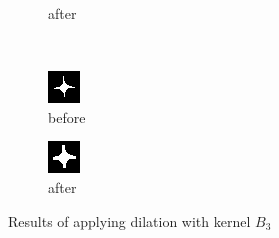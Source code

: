 \documentclass[12pt]{article}
\renewcommand{\subfiguresize}{.25\textwidth}
\begin{document}
\begin{figure}[H]
\begin{subfigure}[t]{\subfiguresize}
        \caption{after}
    \end{subfigure}\\[1em]
    \begin{subfigure}[t]{\subfiguresize}\centering
        \includegraphics[width=\textwidth]{img/image2.png}
        \caption{before}
    \end{subfigure}
    \hspace{2em}
    \begin{subfigure}[t]{\subfiguresize}\centering
        \includegraphics[width=\textwidth]{img/image2-dilation-8adj.png}
        \caption{after}
    \end{subfigure}
    \caption{Results of applying dilation with kernel $B_3$}
\end{figure}    
\end{document}
